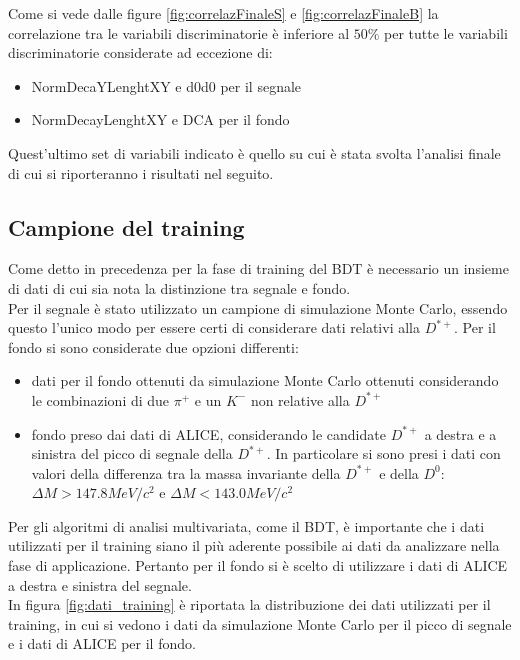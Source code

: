  Come si vede dalle figure \ref{fig:correlazFinaleS} e \ref{fig:correlazFinaleB} la correlazione tra le variabili discriminatorie \`e inferiore al $50 \%$ per tutte le variabili discriminatorie considerate ad eccezione di:
 \begin{itemize}
     \item NormDecaYLenghtXY e d0d0 per il segnale
     \item NormDecayLenghtXY e DCA per il fondo
 \end{itemize}
   
  Quest'ultimo set di variabili indicato \`e quello su cui \`e stata svolta l'analisi finale di cui si riporteranno i risultati nel seguito. 
  



\subsection{Campione del training}
Come detto in precedenza per la fase di training del BDT è necessario un insieme di dati di cui sia nota la distinzione tra segnale e fondo. 
\\Per il segnale è stato utilizzato un campione di simulazione Monte Carlo, essendo questo l'unico modo per essere certi di considerare dati relativi alla $D^{*+}$. Per il fondo si sono considerate due opzioni differenti:
\begin{itemize}
    \item dati per il fondo ottenuti da simulazione Monte Carlo ottenuti considerando le combinazioni di due $\pi^+$ e un $K^-$ non relative alla $D^{*+}$
    \item fondo preso dai dati di ALICE, considerando le candidate $D^{*+}$ a destra e a sinistra del picco di segnale della $D^{*+}$. In particolare si sono presi i dati con valori della differenza tra la massa invariante della $D^{*+}$ e della $D^0$: $\Delta M > 147.8 MeV/c^2$  e $\Delta M < 143.0 MeV/c^2$
\end{itemize}

Per gli algoritmi di analisi multivariata, come il BDT, è importante che i dati utilizzati per il training siano il più aderente possibile ai dati da analizzare nella fase di applicazione. Pertanto per il fondo si è scelto di utilizzare i dati di ALICE a destra e sinistra del segnale.
\\In figura \ref{fig:dati_training} è riportata la distribuzione dei dati utilizzati per il training, in cui si vedono i dati da simulazione Monte Carlo per il picco di segnale e i dati di ALICE per il fondo. 

